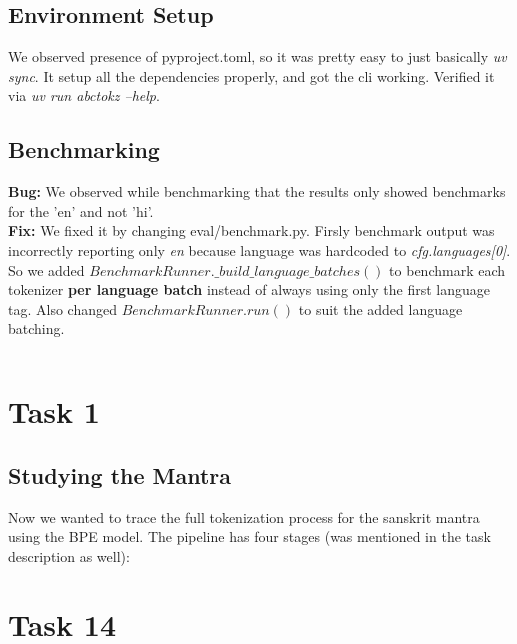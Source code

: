 \documentclass{article}
\begin{document}
\subsection{Environment Setup}
We observed presence of pyproject.toml, so it was pretty easy to just basically \textit{uv sync}.
It setup all the dependencies properly, and got the cli working.
Verified it via \textit{uv run abctokz --help}.


\subsection{Benchmarking}



\textbf{Bug: } We observed while benchmarking that the results only showed benchmarks for the 'en' and not 'hi'. \\
\textbf{Fix: } We fixed it by changing eval/benchmark.py. Firsly benchmark output was incorrectly reporting only \textit{en} because language was hardcoded to \textit{cfg.languages[0]}.
So we added \textit{$BenchmarkRunner.\_build\_language\_batches()$} to benchmark each tokenizer \textbf{per language batch} instead of always using only the first language tag. Also changed \textit{$BenchmarkRunner.run()$} to suit the added language batching.

\begin{verbatim}

\end{verbatim}


\section{Task 1}

\subsection{Studying the Mantra}

Now we wanted to trace the full tokenization process for the sanskrit mantra using the BPE model.
The pipeline has four stages (was mentioned in the task description as well):





\newpage
\section{Task 14}
\end{document}
